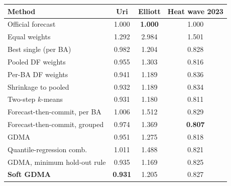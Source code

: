 \begin{tabular}{@{}lccc@{}}
\toprule
Method & Uri & Elliott & Heat wave 2023 \\
\midrule
Official forecast & 1.000 & \textbf{1.000} & 1.000 \\
Equal weights & 1.292 & 2.984 & 1.501 \\
Best single (per BA) & 0.982 & 1.204 & 0.828 \\
Pooled DF weights & 0.955 & 1.303 & 0.816 \\
Per-BA DF weights & 0.941 & 1.189 & 0.836 \\
Shrinkage to pooled & 0.932 & 1.189 & 0.834 \\
Two-step $k$-means & 0.931 & 1.180 & 0.811 \\
Forecast-then-commit, per BA & 1.006 & 1.512 & 0.829 \\
Forecast-then-commit, grouped & 0.974 & 1.369 & \textbf{0.807} \\
GDMA & 0.951 & 1.275 & 0.818 \\
Quantile-regression comb. & 1.011 & 1.488 & 0.821 \\
GDMA, minimum hold-out rule & 0.935 & 1.169 & 0.825 \\
\textbf{Soft GDMA} & \textbf{0.931} & 1.205 & 0.827 \\
\bottomrule
\end{tabular}